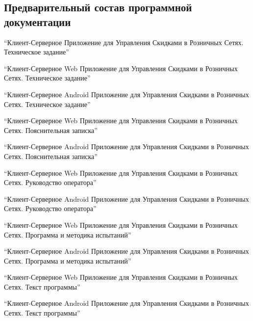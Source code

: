 \subsection{Предварительный состав программной документации}
\begin{my_enumerate}
    \item ``Клиент-Серверное Приложение для Управления Скидками в Розничных Сетях. Техническое задание''
    \item ``Клиент-Серверное Web Приложение для Управления Скидками в Розничных Сетях. Техническое 
    задание''
    \item ``Клиент-Серверное Android Приложение для Управления Скидками в Розничных Сетях. Техническое 
    задание''
    \item ``Клиент-Серверное Web Приложение для Управления Скидками в Розничных Сетях. Пояснительная 
    записка''
    \item ``Клиент-Серверное Android Приложение для Управления Скидками в Розничных Сетях. 
    Пояснительная записка''
    \item ``Клиент-Серверное Web Приложение для Управления Скидками в Розничных Сетях. 
    Руководство оператора''
    \item ``Клиент-Серверное Android Приложение для Управления Скидками в Розничных Сетях. 
    Руководство оператора''
    \item ``Клиент-Серверное Web Приложение для Управления Скидками в Розничных Сетях. Программа и
    методика испытаний''
    \item ``Клиент-Серверное Android Приложение для Управления Скидками в Розничных Сетях. Программа и 
    методика испытаний''
    \item ``Клиент-Серверное Web Приложение для Управления Скидками в Розничных Сетях. Текст программы''
    \item ``Клиент-Серверное Android Приложение для Управления Скидками в Розничных Сетях. Текст 
    программы''
\end{my_enumerate}


